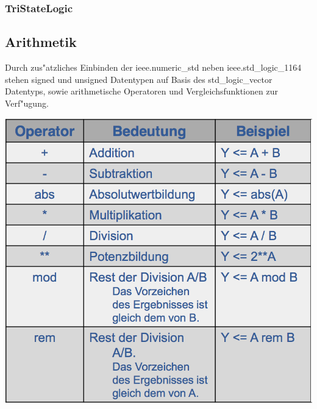 \begin{multicols}{2}
	\subsubsection{TriStateLogic}
	
	\vfill\null
	\columnbreak
	\subsection{Arithmetik}
	\begin{minipage}{0.4\linewidth}
		Durch zus"atzliches Einbinden der ieee.numeric\_std neben ieee.std\_logic\_1164 stehen signed und unsigned Datentypen auf Basis des std\_logic\_vector Datentyps, sowie arithmetische Operatoren und Vergleichsfunktionen zur Verf"ugung.
	\end{minipage}
	\begin{minipage}{0.55\linewidth}
		\includegraphics[width=\linewidth]{pics/arithoperator}
	\end{minipage}
\end{multicols}
	
